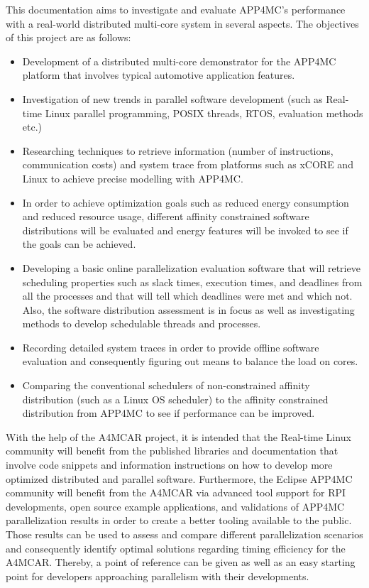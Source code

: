 This documentation aims to investigate and evaluate APP4MC's performance with a real-world distributed multi-core system in several aspects. The objectives of this project are as follows:
\begin{itemize}
	\item Development of a distributed multi-core demonstrator for the APP4MC platform that involves typical automotive application features.
	\item Investigation of new trends in parallel software development (such as Real-time Linux parallel programming, POSIX threads, RTOS, evaluation methods etc.)
	\item Researching techniques to retrieve information (number of instructions, communication costs) and system trace from platforms such as xCORE and Linux to achieve precise modelling with APP4MC.
	\item In order to achieve optimization goals such as reduced energy consumption and reduced resource usage, different affinity constrained software distributions will be evaluated and energy features will be invoked to see if the goals can be achieved.
	\item Developing a basic online parallelization evaluation software that will retrieve scheduling properties such as slack times, execution times, and deadlines from all the processes and that will tell which deadlines were met and which not. Also, the software distribution assessment is in focus as well as investigating methods to develop schedulable threads and processes.
	\item Recording detailed system traces in order to provide offline software evaluation and consequently figuring out means to balance the load on cores.
	\item Comparing the conventional schedulers of non-constrained affinity distribution (such as a Linux OS scheduler) to the affinity constrained distribution from APP4MC to see if performance can be improved.
\end{itemize}

With the help of the A4MCAR project, it is intended that the Real-time Linux community will benefit from the published libraries and documentation that involve code snippets and information instructions on how to develop more optimized distributed and parallel software. Furthermore, the Eclipse APP4MC community will benefit from the A4MCAR via advanced tool support for RPI developments, open source example applications, and validations of APP4MC parallelization results in order to create a better tooling available to the public. Those results can be used to assess and compare different parallelization scenarios and consequently identify optimal solutions regarding timing efficiency for the A4MCAR. Thereby, a point of reference can be given as well as an easy starting point for developers approaching parallelism with their developments. 

